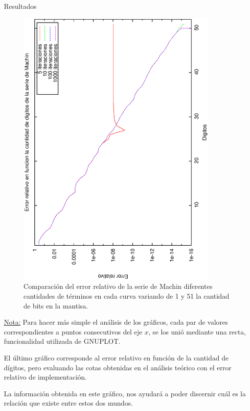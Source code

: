 \begin{section}{Resultados}
	\begin{figure}[H]
	  \centering
		\includegraphics[width=10cm,angle=-90]{graficos/machin_1a51p.eps}
	  \caption{Comparación del error relativo de la serie de Machin diferentes cantidades de términos en cada curva variando de 1 y 51 la cantidad de bits en la mantisa.}
	  \label{fig:machin_51p}
	\end{figure}
	
	\VSP

	\underline{Nota:} Para hacer más simple el análisis de los gráficos, cada par de valores correspondientes a puntos consecutivos del eje $x$, se los unió mediante una recta, funcionalidad utilizada de GNUPLOT.
	
	El último gráfico corresponde al error relativo en función de la cantidad de dígitos, pero evaluando las cotas obtenidas en el análisis teórico con el error relativo de implementación.
	
	La información obtenida en este gráfico, nos ayudará a poder discernir cuál es la relación que existe entre estos dos mundos.
	
	\VSP
	

\end{section}
